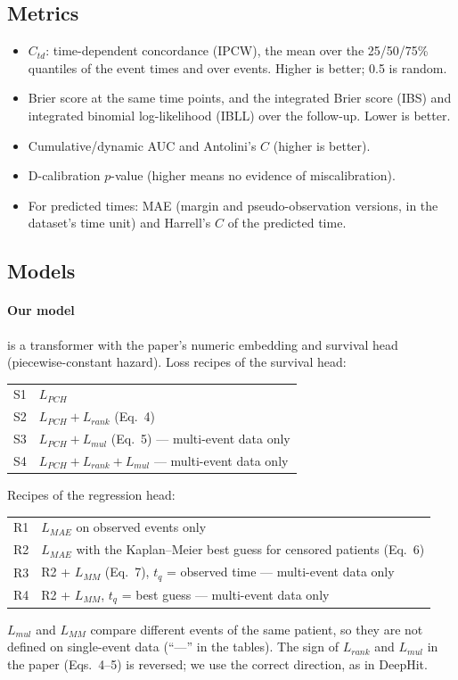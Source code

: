 \documentclass[11pt]{article}
\begin{document}
\subsection{Metrics}
\begin{itemize}
  \item $C_{td}$: time-dependent concordance (IPCW), the mean over the 25/50/75\% quantiles of the event
        times and over events. Higher is better; 0.5 is random.
  \item Brier score at the same time points, and the integrated Brier score (IBS) and integrated
        binomial log-likelihood (IBLL) over the follow-up. Lower is better.
  \item Cumulative/dynamic AUC and Antolini's $C$ (higher is better).
  \item D-calibration $p$-value (higher means no evidence of miscalibration).
  \item For predicted times: MAE (margin and pseudo-observation versions, in the dataset's time unit) and
        Harrell's $C$ of the predicted time.
\end{itemize}

\subsection{Models}
\paragraph{Our model} is a transformer with the paper's numeric embedding and survival head
(piecewise-constant hazard). Loss recipes of the survival head:
\begin{center}
\begin{tabular}{ll}
\toprule
S1 & $L_{PCH}$ \\
S2 & $L_{PCH} + L_{rank}$ (Eq.~4) \\
S3 & $L_{PCH} + L_{mul}$ (Eq.~5) --- multi-event data only \\
S4 & $L_{PCH} + L_{rank} + L_{mul}$ --- multi-event data only \\
\bottomrule
\end{tabular}
\end{center}
Recipes of the regression head:
\begin{center}
\begin{tabular}{ll}
\toprule
R1 & $L_{MAE}$ on observed events only \\
R2 & $L_{MAE}$ with the Kaplan--Meier best guess for censored patients (Eq.~6) \\
R3 & R2 + $L_{MM}$ (Eq.~7), $t_q$ = observed time --- multi-event data only \\
R4 & R2 + $L_{MM}$, $t_q$ = best guess --- multi-event data only \\
\bottomrule
\end{tabular}
\end{center}
$L_{mul}$ and $L_{MM}$ compare different events of the same patient, so they are not defined on
single-event data (``---'' in the tables). The sign of $L_{rank}$ and $L_{mul}$ in the paper (Eqs.~4--5)
is reversed; we use the correct direction, as in DeepHit.
\end{document}
